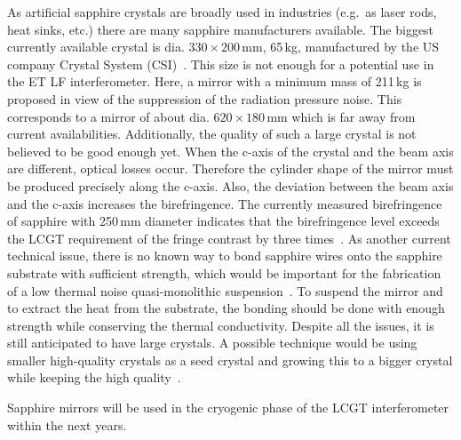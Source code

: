 As artificial sapphire crystals are broadly used in industries (e.g.\ as laser rods, heat sinks, etc.) there are many sapphire manufacturers available. The biggest currently available crystal is dia. $330\times200$\,mm, 65\,kg, manufactured by the US company Crystal System (CSI)~\cite{LCGT09}. This size is not enough for a potential use in the ET LF interferometer. Here, a mirror with a minimum mass of 211\,kg is proposed in view of the suppression of the radiation pressure noise. This corresponds to a mirror of about dia. $620\times180$\,mm which is far away from current availabilities. Additionally, the quality of such a large crystal is not believed to be good enough yet. When the c-axis of the crystal and the beam axis are different, optical losses occur. Therefore the cylinder shape of the mirror must be produced precisely along the c-axis. Also, the deviation between the beam axis and the c-axis increases the birefringence. The currently measured birefringence of sapphire with 250\,mm diameter indicates that the birefringence level exceeds the LCGT requirement of the fringe contrast by three times~\cite{Tokunari10}. As another current technical issue, there is no known way to bond sapphire wires onto the sapphire substrate with sufficient strength, which would be important for the fabrication of a low thermal noise quasi-monolithic suspension~\cite{Dari2010}. To suspend the mirror and to extract the heat from the substrate, the bonding should be done with enough strength while conserving the thermal conductivity. Despite all the issues, it is still anticipated to have large crystals. A possible technique would be using smaller high-quality crystals as a seed crystal and growing this to a bigger crystal while keeping the high quality~\cite{LCGT09}. 

Sapphire mirrors will be used in the cryogenic phase of the LCGT interferometer within the next years.
 

